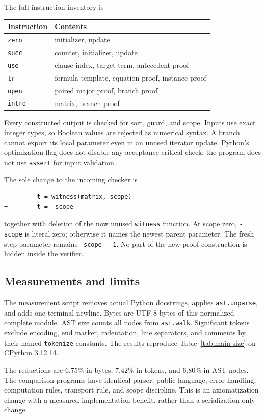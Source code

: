 \documentclass[11pt]{article}
\theoremstyle{definition}\newtheorem{definition}[theorem]{Definition}
\theoremstyle{remark}\newtheorem{remark}[theorem]{Remark}
\newcommand{\code}[1]{\texttt{#1}}
\begin{document}
The full instruction inventory is
\begin{center}\small
\begin{tabular}{ll}
\toprule
Instruction & Contents\\\midrule
\code{zero} & initializer, update\\
\code{succ} & counter, initializer, update\\
\code{use} & clause index, target term, antecedent proof\\
\code{tr} & formula template, equation proof, instance proof\\
\code{open} & paired major proof, branch proof\\
\code{intro} & matrix, branch proof\\
\bottomrule
\end{tabular}
\end{center}
Every constructed output is checked for sort, guard, and scope. Inputs
use exact integer types, so Boolean values are rejected as numerical
syntax. A branch cannot export its local parameter even in an unused
iterator update. Python's optimization flag does not disable any
acceptance-critical check; the program does not use \code{assert} for
input validation.

The sole change to the incoming checker is
\begin{lstlisting}
-        t = witness(matrix, scope)
+        t = -scope
\end{lstlisting}
together with deletion of the now unused \code{witness} function.
At scope zero, \code{-scope} is literal zero; otherwise it names the
newest parent parameter. The fresh step parameter remains
\code{-scope - 1}. No part of the new proof construction is hidden
inside the verifier.

\subsection{Measurements and limits}

The measurement script removes actual Python docstrings, applies
\code{ast.unparse}, and adds one terminal newline. Bytes are UTF-8
bytes of this normalized complete module. AST size counts all nodes
from \code{ast.walk}. Significant tokens exclude encoding, end marker,
indentation, line separators, and comments by their named
\code{tokenize} constants. The results reproduce
Table~\ref{tab:main-size} on CPython 3.12.14.

The reductions are $6.75\%$ in bytes, $7.42\%$ in tokens, and
$6.80\%$ in AST nodes. The comparison programs have identical parser,
public language, error handling, computation rules, transport rule,
and scope discipline. This is an axiomatization change with a measured
implementation benefit, rather than a serialization-only change.
\end{document}
